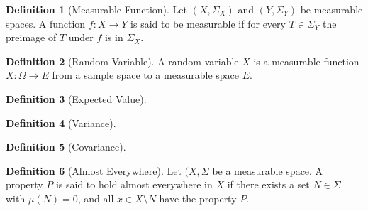 \documentclass{book}
\theoremstyle{definition}
\newtheorem{definition}{Definition}[]
\begin{document}
\begin{definition}[Measurable Function]
    Let \((X, \Sigma_X)\) and \((Y, \Sigma_Y)\) be measurable spaces. A function \(f: X \longrightarrow Y\) is said to be measurable if for every \(T \in \Sigma_Y\) the preimage of \(T\) under \(f\) is in \(\Sigma_X\).
\end{definition}

\begin{definition}[Random Variable]
    A random variable \(X\) is a measurable function \(X: \Omega \longrightarrow E\) from a sample space to a measurable space \(E\).
\end{definition}

\begin{definition}[Expected Value]
    
\end{definition}

\begin{definition}[Variance]
    
\end{definition}

\begin{definition}[Covariance]
    
\end{definition}

\begin{definition}[Almost Everywhere]
    Let \((X, \Sigma\) be a measurable space. A property \(P\) is said to hold almost everywhere in \(X\) if there exists a set \(N \in \Sigma \) with \(\mu(N) = 0\), and all \(x \in X \setminus N\) have the property \(P\).
\end{definition}
\end{document}
